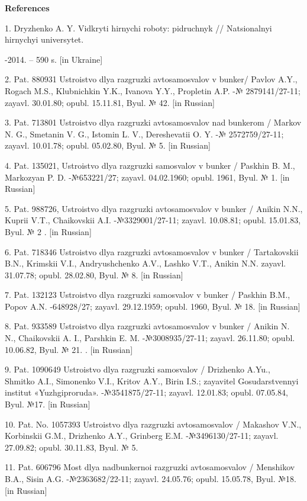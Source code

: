 {\bfseries References}

1. Dryzhenko A. Y. Vidkryti hirnychi roboty: pidruchnyk // Natsionalnyi
hirnychyi universytet.

-2014. -- 590 s. {[}in Ukraine{]}

2. Pat. 880931 Ustroistvo dlya razgruzki avtosamosvalov v bunker/ Pavlov
A.Y., Rogach M.S., Klubnichkin Y.K., Ivanova Y.Y., Propletin A.P. -№
2879141/27-11; zayavl. 30.01.80; opubl. 15.11.81, Byul. № 42. {[}in
Russian{]}

3. Pat. 713801 Ustroistvo dlya razgruzki avtosamosvalov nad bunkerom /
Markov N. G., Smetanin V. G., Istomin L. V., Dereshevatii O. Y. -№
2572759/27-11; zayavl. 10.01.78; opubl. 05.02.80, Byul. № 5. {[}in
Russian{]}

4. Pat. 135021, Ustroistvo dlya razgruzki samosvalov v bunker / Paskhin
B. M., Markozyan P. D. -№653221/27; zayavl. 04.02.1960; opubl. 1961,
Byul. № 1. {[}in Russian{]}

5. Pat. 988726, Ustroistvo dlya razgruzki avtosamosvalov v bunker /
Anikin N.N., Kuprii V.T., Chaikovskii A.I. -№3329001/27-11; zayavl.
10.08.81; opubl. 15.01.83, Byul. № 2 . {[}in Russian{]}

6. Pat. 718346 Ustroistvo dlya razgruzki avtosamosvalov v bunker /
Tartakovskii B.N., Krimskii V.I., Andryushchenko A.V., Lashko V.T.,
Anikin N.N. zayavl. 31.07.78; opubl. 28.02.80, Byul. № 8. {[}in
Russian{]}

7. Pat. 132123 Ustroistvo dlya razgruzki samosvalov v bunker / Paskhin
B.M., Popov A.N. -648928/27; zayavl. 29.12.1959; opubl. 1960, Byul. №
18. {[}in Russian{]}

8. Pat. 933589 Ustroistvo dlya razgruzki avtosamosvalov v bunker /
Anikin N. N., Chaikovskii A. I., Parshkin E. M. -№3008935/27-11; zayavl.
26.11.80; opubl. 10.06.82, Byul. № 21. . {[}in Russian{]}

9. Pat. 1090649 Ustroistvo dlya razgruzki samosvalov / Drizhenko A.Yu.,
Shmitko A.I., Simonenko V.I., Kritov A.Y., Birin I.S.;
zayavitel\textquotesingle{} Gosudarstvennyi institut «Yuzhgiproruda».
-№3541875/27-11; zayavl. 12.01.83; opubl. 07.05.84, Byul. №17. {[}in
Russian{]}

10. Pat. No. 1057393 Ustroistvo dlya razgruzki avtosamosvalov / Makashov
V.N., Korbinskii G.M., Drizhenko A.Y., Grinberg E.M. -№3496130/27-11;
zayavl. 27.09.82; opubl. 30.11.83, Byul. № 5.

11. Pat. 606796 Most dlya nadbunkernoi razgruzki avtosamosvalov /
Menshikov B.A., Sisin A.G. -№2363682/22-11; zayavl. 24.05.76; opubl.
15.05.78, Byul. №18. {[}in Russian{]}

